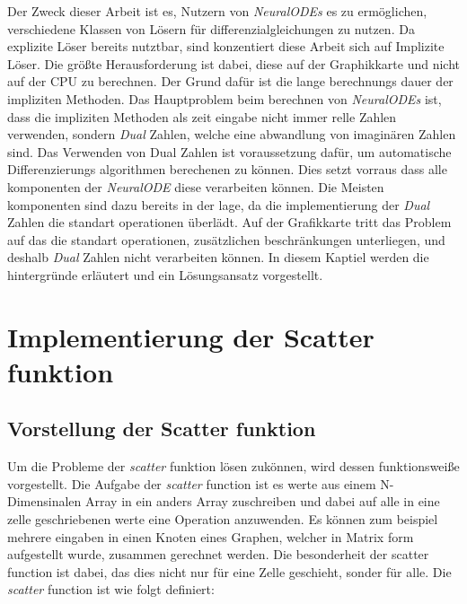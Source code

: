 Der Zweck dieser Arbeit ist es, Nutzern von \textit{NeuralODEs} es zu ermöglichen, 
verschiedene Klassen von Lösern für differenzialgleichungen zu nutzen.
Da explizite Löser bereits nutztbar, 
sind konzentiert diese Arbeit sich auf Implizite Löser. 
Die größte Herausforderung ist dabei, 
diese auf der Graphikkarte und nicht auf der CPU zu berechnen.
Der Grund dafür ist die lange berechnungs dauer der impliziten Methoden.
Das Hauptproblem beim berechnen von \textit{NeuralODEs} ist, 
dass die impliziten Methoden als zeit eingabe nicht immer relle Zahlen verwenden,
sondern \textit{Dual} Zahlen, welche eine abwandlung von imaginären Zahlen sind.
Das Verwenden von Dual Zahlen ist voraussetzung dafür, 
um automatische Differenzierungs algorithmen berechenen zu können.
Dies setzt vorraus dass alle komponenten der \textit{NeuralODE} diese verarbeiten können.
Die Meisten komponenten sind dazu bereits in der lage, 
da die implementierung der \textit{Dual} Zahlen
die standart operationen überlädt.
Auf der Grafikkarte tritt das Problem auf das die standart operationen, 
zusätzlichen beschränkungen unterliegen, 
und deshalb \textit{Dual} Zahlen nicht verarbeiten können.
In diesem Kaptiel werden die hintergründe erläutert und ein Lösungsansatz vorgestellt.


\section{Implementierung der Scatter funktion}
\subsection{Vorstellung der Scatter funktion}

Um die Probleme der \textit{scatter} funktion lösen zukönnen, 
wird dessen funktionsweiße vorgestellt.
Die Aufgabe der \textit{scatter} function ist es werte aus einem N-Dimensinalen Array in ein anders 
Array zuschreiben und dabei auf alle in eine zelle geschriebenen werte eine Operation anzuwenden.
Es können zum beispiel mehrere eingaben in einen Knoten eines Graphen, 
welcher in Matrix form aufgestellt wurde,
zusammen gerechnet werden.
Die besonderheit der scatter function ist dabei, 
das dies nicht nur für eine Zelle geschieht, 
sonder für alle.
Die \textit{scatter} function ist wie folgt definiert:

